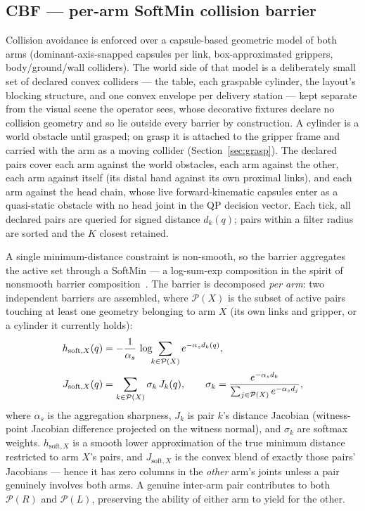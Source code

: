 \subsection{CBF --- per-arm SoftMin collision barrier}
\label{sec:cbf}

Collision avoidance is enforced over a capsule-based geometric model of both arms (dominant-axis-snapped capsules per link, box-approximated grippers, body/ground/wall colliders). The world side of that model is a deliberately small set of declared convex colliders --- the table, each graspable cylinder, the layout's blocking structure, and one convex envelope per delivery station --- kept separate from the visual scene the operator sees, whose decorative fixtures declare no collision geometry and so lie outside every barrier by construction. A cylinder is a world obstacle until grasped; on grasp it is attached to the gripper frame and carried with the arm as a moving collider (Section~\ref{sec:grasp}). The declared pairs cover each arm against the world obstacles, each arm against the other, each arm against itself (its distal hand against its own proximal links), and each arm against the head chain, whose live forward-kinematic capsules enter as a quasi-static obstacle with no head joint in the QP decision vector. Each tick, all declared pairs are queried for signed distance $d_k(q)$; pairs within a filter radius are sorted and the $K$ closest retained.

A single minimum-distance constraint is non-smooth, so the barrier aggregates the active set through a SoftMin --- a log-sum-exp composition in the spirit of nonsmooth barrier composition~\cite{glotfelter2017}. The barrier is decomposed \emph{per arm}: two independent barriers are assembled, where $\mathcal{P}(X)$ is the subset of active pairs touching at least one geometry belonging to arm $X$ (its own links and gripper, or a cylinder it currently holds):
\begin{align}
h_{\text{soft},X}(q) &= -\frac{1}{\alpha_s}\,\log\!\!\sum_{k \in \mathcal{P}(X)} e^{-\alpha_s d_k(q)}, \notag\\[2pt]
J_{\text{soft},X}(q) &= \sum_{k \in \mathcal{P}(X)} \sigma_k\, J_k(q),
\qquad
\sigma_k = \frac{e^{-\alpha_s d_k}}{\sum_{j \in \mathcal{P}(X)} e^{-\alpha_s d_j}},
\label{eq:softmin}
\end{align}
where $\alpha_s$ is the aggregation sharpness, $J_k$ is pair $k$'s distance Jacobian (witness-point Jacobian difference projected on the witness normal), and $\sigma_k$ are softmax weights. $h_{\text{soft},X}$ is a smooth lower approximation of the true minimum distance restricted to arm $X$'s pairs, and $J_{\text{soft},X}$ is the convex blend of exactly those pairs' Jacobians --- hence it has zero columns in the \emph{other} arm's joints unless a pair genuinely involves both arms. A genuine inter-arm pair contributes to both $\mathcal{P}(R)$ and $\mathcal{P}(L)$, preserving the ability of either arm to yield for the other.

